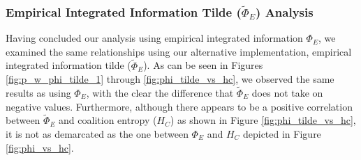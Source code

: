 \documentclass[a4paper,11pt]{article}
\begin{document}
\subsubsection{Empirical Integrated Information Tilde ($\widetilde{\Phi}_E$) Analysis}
\label{sec:app:snn:res:phi-tilde}
Having concluded our analysis using empirical integrated information $\Phi_E$, we examined the same relationships using our alternative implementation, empirical integrated information tilde ($\widetilde{\Phi}_E$). As can be seen in Figures \ref{fig:p_w_phi_tilde_1} through \ref{fig:phi_tilde_vs_hc}, we observed the same results as using $\Phi_E$, with the clear the difference that $\widetilde{\Phi}_E$ does not take on negative values. Furthermore, although there appears to be a positive correlation between $\widetilde{\Phi}_E$ and coalition entropy ($H_C$) as shown in Figure \ref{fig:phi_tilde_vs_hc}, it is not as demarcated as the one between $\Phi_E$ and $H_C$ depicted in Figure \ref{fig:phi_vs_hc}.

\end{document}
